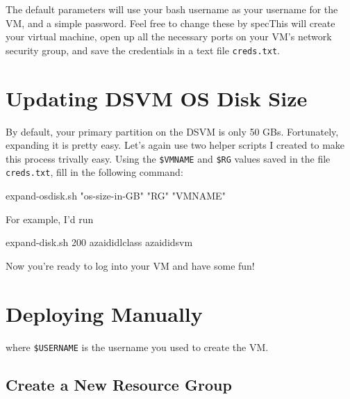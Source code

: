 \documentclass[]{book}
\newenvironment{Shaded}{\begin{snugshade}}{\end{snugshade}}
\newcommand{\StringTok}[1]{\textcolor[rgb]{0.31,0.60,0.02}{#1}}
\newcommand{\FunctionTok}[1]{\textcolor[rgb]{0.00,0.00,0.00}{#1}}
\newcommand{\VariableTok}[1]{\textcolor[rgb]{0.00,0.00,0.00}{#1}}
\newcommand{\ExtensionTok}[1]{#1}
\newcommand{\NormalTok}[1]{#1}
\theoremstyle{definition}
\theoremstyle{definition}
\theoremstyle{definition}
\theoremstyle{remark}
\begin{document}
The default parameters will use your bash username as your username for
the VM, and a simple password. Feel free to change these by specThis
will create your virtual machine, open up all the necessary ports on
your VM's network security group, and save the credentials in a text
file \texttt{creds.txt}.

\section{Updating DSVM OS Disk Size}\label{updating-dsvm-os-disk-size}

By default, your primary partition on the DSVM is only 50 GBs.
Fortunately, expanding it is pretty easy. Let's again use two helper
scripts I created to make this process trivally easy. Using the
\texttt{\$VMNAME} and \texttt{\$RG} values saved in the file
\texttt{creds.txt}, fill in the following command:

\begin{Shaded}
\begin{Highlighting}[]
\ExtensionTok{expand-osdisk.sh} \StringTok{"os-size-in-GB"} \StringTok{"RG"} \StringTok{"VMNAME"}
\end{Highlighting}
\end{Shaded}

For example, I'd run

\begin{Shaded}
\begin{Highlighting}[]
\ExtensionTok{expand-disk.sh}\NormalTok{ 200 azaididlclass azaididsvm}
\end{Highlighting}
\end{Shaded}

Now you're ready to log into your VM and have some fun!

\section{Deploying Manually}\label{deploying-manually}

\begin{Shaded}
\end{Shaded}

where \texttt{\$USERNAME} is the username you used to create the VM.

\subsection{Create a New Resource
Group}\label{create-a-new-resource-group}
\end{document}

